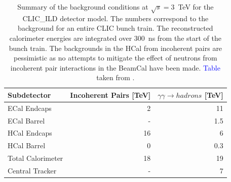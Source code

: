 \begin{table}[h!]
\centering
\begin{tabular}{ l r r }
\hline
Subdetector & Incoherent Pairs [TeV] & $\gamma\gamma \rightarrow hadrons$ [TeV] \\ 
\hline
ECal Endcaps & 2 & 11 \\
ECal Barrel & - & 1.5 \\
HCal Endcaps & 16 & 6 \\
HCal Barrel & 0 & 0.3 \\
\hline
Total Calorimeter & 18 & 19 \\
\hline
Central Tracker & - & 7 \\ 
\hline
\end{tabular}
\caption[Summary of the background conditions at $\sqrt{s}=3$~TeV for the CLIC\_ILD detector model.  The numbers correspond to the background for an entire CLIC bunch train, i.e. 312 bunch crossings separated by a 0.5~ns gap.  The reconstructed calorimeter energies are integrated over 300~ns from the start of the bunch train. The backgrounds in the HCal from incoherent pairs are pessimistic as no attempts to mitigate the effect of neutrons from incoherent pair interactions in the BeamCal have been made.  \textcolor{blue}{Table} taken from \cite{Linssen:2012hp}.]{Summary of the background conditions at $\sqrt{s}=3$~TeV for the CLIC\_ILD detector model.  The numbers correspond to the background for an entire CLIC bunch train.  The reconstructed calorimeter energies are integrated over 300~ns from the start of the bunch train. The backgrounds in the HCal from incoherent pairs are pessimistic as no attempts to mitigate the effect of neutrons from incoherent pair interactions in the BeamCal have been made.  \textcolor{blue}{Table} taken from \cite{Linssen:2012hp}.}
\label{table:clicbkgsummary}
\end{table}


